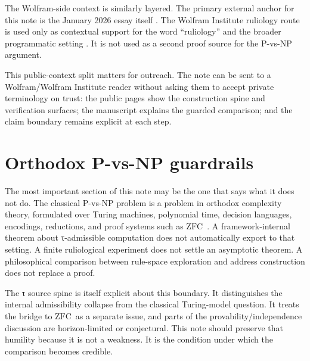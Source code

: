 \documentclass{pantarhei-researchnote}
\newcommand{\ZFC}{\ensuremath{\mathrm{ZFC}}}
\begin{document}
The Wolfram-side context is similarly layered. The primary external
anchor for this note is the January 2026 essay itself
\cite{Wolfram2026RuliologicalPNP}. The Wolfram Institute ruliology route
is used only as contextual support for the word ``ruliology'' and the
broader programmatic setting \cite{WolframInstituteRuliology}. It is not
used as a second proof source for the P-vs-NP argument.

This public-context split matters for outreach. The note can be sent to
a Wolfram/Wolfram Institute reader without asking them to accept private
terminology on trust: the public pages show the construction spine and
verification surfaces; the manuscript explains the guarded comparison;
and the claim boundary remains explicit at each step.

\section{Orthodox P-vs-NP guardrails}
\label{sec:guardrails}

The most important section of this note may be the one that says what it
does not do. The classical P-vs-NP problem is a problem in orthodox
complexity theory, formulated over Turing machines, polynomial time,
decision languages, encodings, reductions, and proof systems such as
\ZFC\ \cite{ClayPvsNP}. A framework-internal theorem about τ-admissible computation does not
automatically export to that setting. A finite ruliological experiment
does not settle an asymptotic theorem. A philosophical comparison between
rule-space exploration and address construction does not replace a proof.

The τ source spine is itself explicit about this boundary. It distinguishes
the internal admissibility collapse from the classical Turing-model
question. It treats the bridge to \ZFC\ as a separate issue, and parts of
the provability/independence discussion are horizon-limited or conjectural.
This note should preserve that humility because it is not a weakness. It
is the condition under which the comparison becomes credible.
\end{document}
